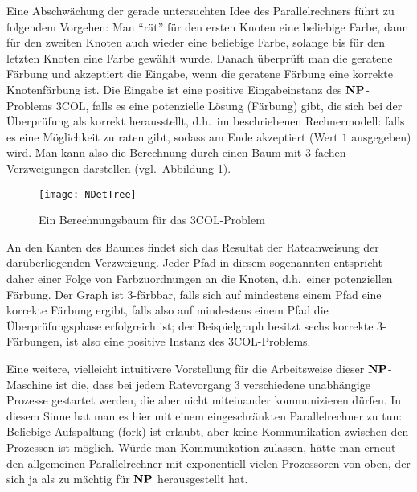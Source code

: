 Eine Abschwächung der gerade untersuchten Idee des Parallelrechners
führt zu folgendem Vorgehen: Man "`rät"' für den ersten Knoten eine
beliebige Farbe, dann für den zweiten Knoten auch wieder eine
beliebige Farbe, solange bis für den letzten Knoten eine Farbe gewählt
wurde. Danach überprüft man die geratene Färbung und akzeptiert die
Eingabe, wenn die geratene Färbung eine korrekte Knotenfärbung
ist. Die Eingabe ist eine positive Eingabeinstanz des $\mathbf{N}\mathbf{P}$-Problems
$3\mathrm{COL}$, falls es eine potenzielle Lösung (Färbung) gibt, die
sich bei der Überprüfung als korrekt herausstellt, d.h.~im
beschriebenen Rechnermodell: falls es eine Möglichkeit zu raten gibt,
sodass am Ende akzeptiert (Wert $1$ ausgegeben) wird. Man kann also
die Berechnung durch einen Baum mit $3$-fachen Verzweigungen
darstellen (vgl.~Abbildung \ref{Tree3COL}).
%
\begin{figure}
\centerline{\texttt{[image: NDetTree]}}
\caption{Ein Berechnungsbaum für das $3\mathrm{COL}$-Problem}
\label{Tree3COL}
\end{figure}
%
An den Kanten des Baumes findet sich das Resultat der Rateanweisung
der darüberliegenden Verzweigung. Jeder Pfad in diesem sogenannten
 entspricht daher einer Folge von
Farbzuordnungen an die Knoten, d.h.~einer potenziellen Färbung. Der
Graph ist $3$-färbbar, falls sich auf mindestens einem Pfad eine
korrekte Färbung ergibt, falls also auf mindestens einem Pfad die
Überprüfungsphase 
erfolgreich ist; der Beispielgraph besitzt sechs korrekte $3$-Färbungen, 
ist also eine positive Instanz des $3\mathrm{COL}$-Problems.

Eine weitere, vielleicht intuitivere Vorstellung für die Arbeitsweise
dieser $\mathbf{N}\mathbf{P}$-Ma\-schi\-ne ist die, dass bei jedem Ratevorgang $3$
verschiedene unabhängige Prozesse gestartet werden, die aber nicht
miteinander kommunizieren dürfen. In diesem Sinne hat man es hier mit
einem eingeschränkten Parallelrechner zu tun: Beliebige Aufspaltung
(fork) ist erlaubt, aber keine Kommunikation zwischen den Prozessen
ist möglich. Würde man Kommunikation zulassen, hätte man erneut den
allgemeinen Parallelrechner mit exponentiell vielen Prozessoren von
oben, der sich ja als zu mächtig für $\mathbf{N}\mathbf{P}$ herausgestellt hat.

